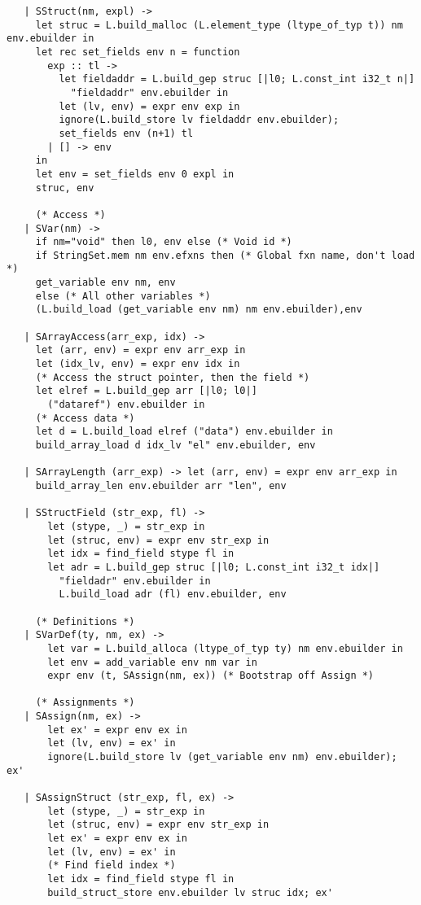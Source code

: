 \documentclass[main.tex]{subfiles}
\begin{document}
\begin{lstlisting}
   | SStruct(nm, expl) ->
     let struc = L.build_malloc (L.element_type (ltype_of_typ t)) nm env.ebuilder in
     let rec set_fields env n = function
       exp :: tl -> 
         let fieldaddr = L.build_gep struc [|l0; L.const_int i32_t n|]
           "fieldaddr" env.ebuilder in 
         let (lv, env) = expr env exp in
         ignore(L.build_store lv fieldaddr env.ebuilder);
         set_fields env (n+1) tl
       | [] -> env
     in
     let env = set_fields env 0 expl in
     struc, env

     (* Access *)
   | SVar(nm) -> 
     if nm="void" then l0, env else (* Void id *)
     if StringSet.mem nm env.efxns then (* Global fxn name, don't load *)
     get_variable env nm, env
     else (* All other variables *) 
     (L.build_load (get_variable env nm) nm env.ebuilder),env

   | SArrayAccess(arr_exp, idx) -> 
     let (arr, env) = expr env arr_exp in
     let (idx_lv, env) = expr env idx in
     (* Access the struct pointer, then the field *)
     let elref = L.build_gep arr [|l0; l0|]
       ("dataref") env.ebuilder in
     (* Access data *)
     let d = L.build_load elref ("data") env.ebuilder in
     build_array_load d idx_lv "el" env.ebuilder, env

   | SArrayLength (arr_exp) -> let (arr, env) = expr env arr_exp in
     build_array_len env.ebuilder arr "len", env

   | SStructField (str_exp, fl) ->
       let (stype, _) = str_exp in
       let (struc, env) = expr env str_exp in
       let idx = find_field stype fl in
       let adr = L.build_gep struc [|l0; L.const_int i32_t idx|]
         "fieldadr" env.ebuilder in
         L.build_load adr (fl) env.ebuilder, env

     (* Definitions *)
   | SVarDef(ty, nm, ex) ->  
       let var = L.build_alloca (ltype_of_typ ty) nm env.ebuilder in
       let env = add_variable env nm var in
       expr env (t, SAssign(nm, ex)) (* Bootstrap off Assign *)

     (* Assignments *)
   | SAssign(nm, ex) ->
       let ex' = expr env ex in
       let (lv, env) = ex' in
       ignore(L.build_store lv (get_variable env nm) env.ebuilder); ex'

   | SAssignStruct (str_exp, fl, ex) ->
       let (stype, _) = str_exp in
       let (struc, env) = expr env str_exp in
       let ex' = expr env ex in
       let (lv, env) = ex' in
       (* Find field index *)
       let idx = find_field stype fl in
       build_struct_store env.ebuilder lv struc idx; ex'


\end{lstlisting}
\end{document}
